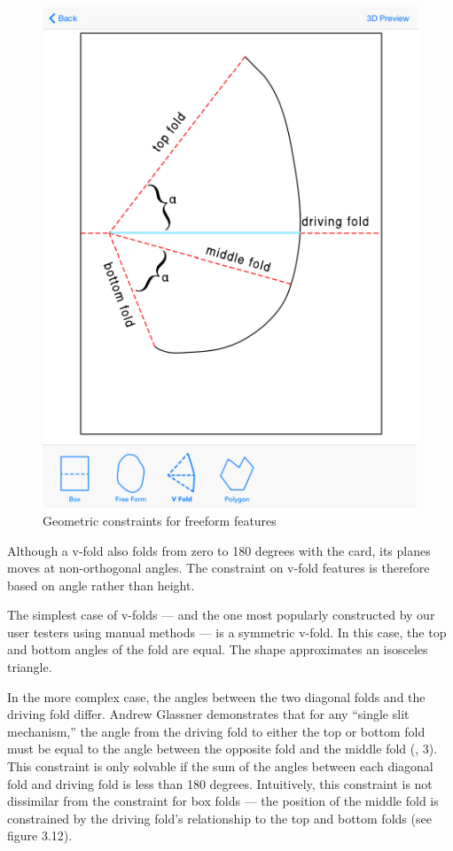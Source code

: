 \begin{figure}[htbp]
\centering
\includegraphics{figures/45_Tech_Constraints/vfoldConstraints.pdf}
\caption{Geometric constraints for freeform features}
\end{figure}

Although a v-fold also folds from zero to 180 degrees with the card, its
planes moves at non-orthogonal angles. The constraint on v-fold features
is therefore based on angle rather than height.

The simplest case of v-folds --- and the one most popularly constructed
by our user testers using manual methods --- is a symmetric v-fold. In
this case, the top and bottom angles of the fold are equal. The shape
approximates an isosceles triangle.

In the more complex case, the angles between the two diagonal folds and
the driving fold differ. Andrew Glassner demonstrates that for any
``single slit mechanism,'' the angle from the driving fold to either the
top or bottom fold must be equal to the angle between the opposite fold
and the middle fold (\citet{glassner1998interactive}, 3). This
constraint is only solvable if the sum of the angles between each
diagonal fold and driving fold is less than 180 degrees. Intuitively,
this constraint is not dissimilar from the constraint for box folds ---
the position of the middle fold is constrained by the driving fold's
relationship to the top and bottom folds (see figure 3.12).

